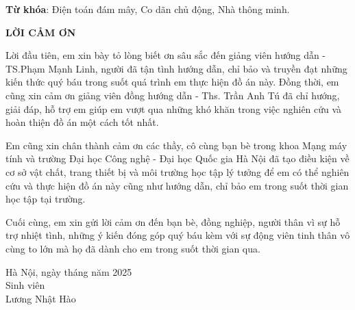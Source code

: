 \begin{titlepage}
    \begin{center}
        \textbf{\fontsize{12}{14.4}\selectfont{TÓM TẮT}}
    \end{center}

    \fontsize{12}{14.4}\selectfont{
        Hiện nay
    }

    \noindent\textbf{Từ khóa}: Điện toán đám mây, Co dãn chủ động, Nhà thông minh.

    \newpage

    \begin{center}
        \textbf{\fontsize{12}{14.4}\selectfont\uppercase{{Lời cảm ơn}}}
    \end{center}

    Lời đầu tiên, em xin bày tỏ lòng biết ơn sâu sắc đến giảng viên hướng dẫn - TS.Phạm Mạnh Linh, người đã tận tình hướng dẫn, chỉ bảo và truyền đạt những kiến thức quý báu trong suốt quá trình em thực hiện đồ án này. Đồng thời, em cũng xin cảm ơn giảng viên đồng hướng dẫn - Ths. Trần Anh Tú đã chỉ hướng, giải đáp, hỗ trợ em giúp em vượt qua những khó khăn trong việc nghiên cứu và hoàn thiện đồ án một cách tốt nhất.

    Em cũng xin chân thành cảm ơn các thầy, cô cùng bạn bè trong khoa Mạng máy tính và trường Đại học Công nghệ - Đại học Quốc gia Hà Nội đã tạo điều kiện về cơ sở vật chất, trang thiết bị và môi trường học tập lý tưởng để em có thể nghiên cứu và thực hiện đồ án này cũng như hướng dẫn, chỉ bảo em trong suốt thời gian học tập tại trường.

    Cuối cùng, em xin gửi lời cảm ơn đến bạn bè, đồng nghiệp, người thân vì sự hỗ trợ nhiệt tình, những ý kiến đóng góp quý báu kèm với sự động viên tinh thân vô cùng to lớn mà họ đã dành cho em trong suốt thời gian qua.

    \begin{flushright}
        \begin{minipage}{0.6\linewidth}
            \begin{center}
                Hà Nội, ngày  tháng  năm 2025\\
                Sinh viên\\
                \vspace{2cm}
                Lương Nhật Hào
            \end{center}
        \end{minipage}
    \end{flushright}
\end{titlepage}
